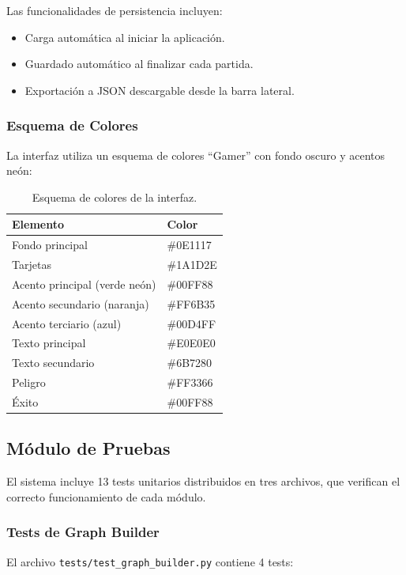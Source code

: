 \documentclass[12pt,a4paper]{article}
\begin{document}
Las funcionalidades de persistencia incluyen:
\begin{itemize}[itemsep=2pt]
    \item Carga automática al iniciar la aplicación.
    \item Guardado automático al finalizar cada partida.
    \item Exportación a JSON descargable desde la barra lateral.
\end{itemize}

\subsubsection{Esquema de Colores}

La interfaz utiliza un esquema de colores ``Gamer'' con fondo oscuro y acentos neón:

\begin{table}[H]
\centering
\caption{Esquema de colores de la interfaz.}
\label{tab:colores}
\begin{tabular}{ll}
\toprule
\textbf{Elemento} & \textbf{Color} \\
\midrule
Fondo principal & \#0E1117 \\
Tarjetas & \#1A1D2E \\
Acento principal (verde neón) & \#00FF88 \\
Acento secundario (naranja) & \#FF6B35 \\
Acento terciario (azul) & \#00D4FF \\
Texto principal & \#E0E0E0 \\
Texto secundario & \#6B7280 \\
Peligro & \#FF3366 \\
Éxito & \#00FF88 \\
\bottomrule
\end{tabular}
\end{table}

\subsection{Módulo de Pruebas}

El sistema incluye 13 tests unitarios distribuidos en tres archivos, que verifican el correcto funcionamiento de cada módulo.

\subsubsection{Tests de Graph Builder}

El archivo \texttt{tests/test\_graph\_builder.py} contiene 4 tests:
\end{document}
